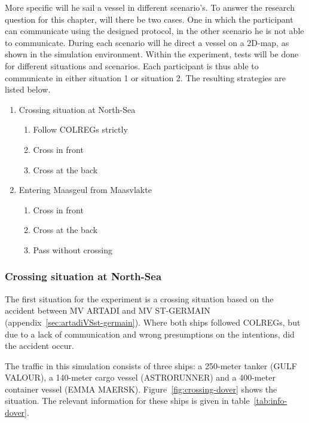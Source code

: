 More specific will he sail a vessel in different scenario's. To answer the research question for this chapter, will there be two cases. One in which the participant can communicate using the designed protocol, in the other scenario he is not able to communicate. During each scenario will he direct a vessel on a 2D-map, as shown in the simulation environment.
Within the experiment, tests will be done for different situations and scenarios. Each participant is thus able to communicate in either situation 1 or situation 2. The resulting strategies are listed below.
\begin{multicols}{2}
	\begin{enumerate}
		\item Crossing situation at North-Sea
		\begin{enumerate}[label=(\Alph*)]
			\item Follow COLREGs strictly
			\item Cross in front
			\item Cross at the back
		\end{enumerate}
		\item Entering Maasgeul from Maasvlakte
		\begin{enumerate}[label=(\Alph*)]
			\item Cross in front
			\item Cross at the back
			\item Pass without crossing
		\end{enumerate}
	\end{enumerate}
\end{multicols}

\newpage

\subsubsection{Crossing situation at North-Sea}
\label{ssec:crossing-north-sea}
The first situation for the experiment is a crossing situation based on the accident between MV ARTADI and MV ST-GERMAIN (appendix~\ref{sec:artadiVSst-germain}). Where both ships followed COLREGs, but due to a lack of communication and wrong presumptions on the intentions, did the accident occur.

The traffic in this simulation consists of three ships: a 250-meter tanker (GULF VALOUR), a 140-meter cargo vessel (ASTRORUNNER) and a 400-meter container vessel (EMMA MAERSK). Figure~\ref{fig:crossing-dover} shows the situation. The relevant information for these ships is given in table~\ref{tab:info-dover}.

